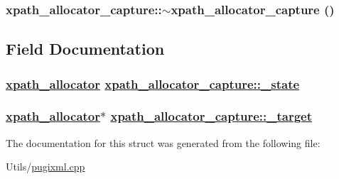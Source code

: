 \hypertarget{structxpath__allocator__capture_09d4f62de6a543483b94eec405667101}{
\subsubsection[$\sim$xpath\_\-allocator\_\-capture]{\setlength{\rightskip}{0pt plus 5cm}xpath\_\-allocator\_\-capture::$\sim$xpath\_\-allocator\_\-capture ()}}
\label{structxpath__allocator__capture_09d4f62de6a543483b94eec405667101}




\subsection{Field Documentation}
\hypertarget{structxpath__allocator__capture_275859dc99681c12b42ee4f51b713d39}{
\subsubsection[\_\-state]{\setlength{\rightskip}{0pt plus 5cm}\hyperlink{classxpath__allocator}{xpath\_\-allocator} \hyperlink{structxpath__allocator__capture_275859dc99681c12b42ee4f51b713d39}{xpath\_\-allocator\_\-capture::\_\-state}}}
\label{structxpath__allocator__capture_275859dc99681c12b42ee4f51b713d39}


\hypertarget{structxpath__allocator__capture_382acca931c691699ec84a03fb060cf4}{
\subsubsection[\_\-target]{\setlength{\rightskip}{0pt plus 5cm}\hyperlink{classxpath__allocator}{xpath\_\-allocator}$\ast$ \hyperlink{structxpath__allocator__capture_382acca931c691699ec84a03fb060cf4}{xpath\_\-allocator\_\-capture::\_\-target}}}
\label{structxpath__allocator__capture_382acca931c691699ec84a03fb060cf4}




The documentation for this struct was generated from the following file:\begin{CompactItemize}
\item 
Utils/\hyperlink{pugixml_8cpp}{pugixml.cpp}\end{CompactItemize}

